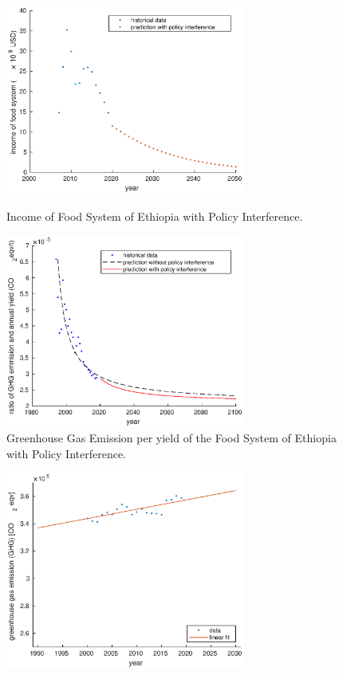 \documentclass[12pt]{article}
\begin{document}
\begin{appendices}
\begin{figure}[htbp]
\begin{minipage}[t]{0.48\textwidth}
        \centering
        \includegraphics[width=0.7\textwidth]{figure/model/Ethiopia/Ethiopia_profit.eps}
        \caption{Income of Food System of Ethiopia with Policy Interference.}
    \end{minipage}
    \begin{minipage}[t]{0.48\textwidth}
        \centering
        \includegraphics[width=0.7\textwidth]{figure/model/Ethiopia/Ethiopia_sustainability.eps}
        \caption{Greenhouse Gas Emission per yield of the Food System of Ethiopia with Policy Interference.}
    \end{minipage}
\end{figure}
\begin{figure}[htbp]
    \centering
    \begin{minipage}[t]{0.48\textwidth}
        \centering
        \includegraphics[width=0.7\textwidth]{figure/model/USA/USA_GHG_fit.eps}

\end{minipage}
\end{figure}
\end{appendices}
\end{document}
